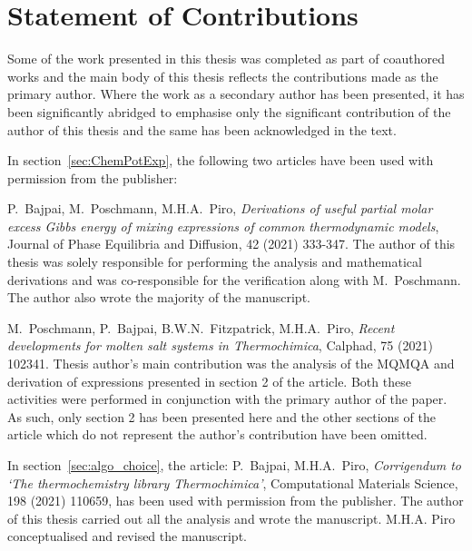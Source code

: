 \chapter*{Statement of Contributions}
Some of the work presented in this thesis was completed as part of coauthored works and the main body of this thesis reflects the contributions made as the primary author. Where the work as a secondary author has been presented, it has been significantly abridged to emphasise only the significant contribution of the author of this thesis and the same has been acknowledged in the text. 

In section~\ref{sec:ChemPotExp}, the following two articles have been used with permission from the publisher:
\begin{enumerate}{\small \compresslist
    \item {P.\ Bajpai}, {M.\ Poschmann}, {M.H.A.\ Piro}, \textit{Derivations of useful partial molar excess Gibbs energy of mixing expressions of common thermodynamic models}, {Journal of Phase Equilibria and Diffusion, 42 (2021) 333-347}. 
The author of this thesis was solely responsible for performing the analysis and mathematical derivations and was co-responsible for the verification along with M.\ Poschmann. The author also wrote the majority of the manuscript. 
    
    \item {M.\ Poschmann}, {P.\ Bajpai}, {B.W.N.\ Fitzpatrick}, {M.H.A.\ Piro}, \textit{Recent developments for molten salt systems in Thermochimica}, {Calphad, 75 (2021) 102341}. 
Thesis author's main contribution was the analysis of the MQMQA and derivation of expressions presented in section 2 of the article. Both these activities were performed in conjunction with the primary author of the paper. As such, only section 2 has been presented here and the other sections of the article which do not represent the author's contribution have been omitted.
   }
\end{enumerate}


In section~\ref{sec:algo_choice}, the article: {P.\ Bajpai}, {M.H.A.\ Piro}, \textit{Corrigendum to `The thermochemistry library Thermochimica'}, {Computational Materials Science, 198 (2021) 110659}, has been used with permission from the publisher. The author of this thesis carried out all the analysis and wrote the manuscript. M.H.A. Piro conceptualised and revised the manuscript.

